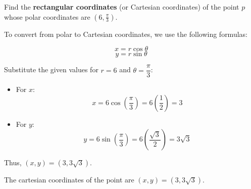 \documentclass{article}
\begin{document}
\begin{examplebox}
Find the \textbf{rectangular coordinates} (or Cartesian coordinates) of the point \( p \) whose polar coordinates are \( (6, \frac{\pi}{3}) \).

\begin{solutionbox}
To convert from polar to Cartesian coordinates, we use the following formulas:

\[
    x = r \cos \theta
\]
\[
    y = r \sin \theta
\]

Substitute the given values for \( r = 6 \) and \( \theta = \dfrac{\pi}{3} \):

\begin{itemize}
    \item For \( x \):
    \[
        x = 6 \cos \left( \frac{\pi}{3} \right) = 6 \left( \frac{1}{2} \right) = 3
    \]
    \item For \( y \):
    \[
        y = 6 \sin \left( \frac{\pi}{3} \right) = 6 \left( \frac{\sqrt{3}}{2} \right) = 3\sqrt{3}
    \]
\end{itemize}

Thus, \( (x, y) = (3, 3\sqrt{3}) \).

\begin{answerbox}
    The cartesian coordinates of the point are \( (x, y) = (3, 3\sqrt{3}) \).
\end{answerbox}

\end{solutionbox}
\end{examplebox}
\end{document}
